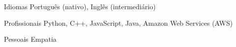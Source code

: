 
\begin{cvskills}
	\cvskill
	{Idiomas}
	{Português (nativo), Inglês (intermediário)}

	\cvskill
	{Profissionais}
	{Python, C++, JavaScript, Java, Amazon Web Services (AWS)}

	\cvskill
	{Pessoais}
	{Empatia}
\end{cvskills}
